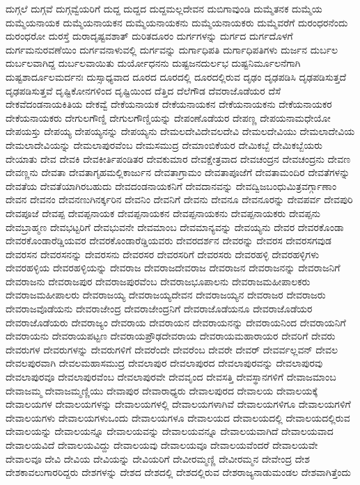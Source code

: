 {ದುಗ್ಗಲೆ
ದುಗ್ಗವೆ
ದುಗ್ಗವ್ವೆಯರಿಗೆ
ದುದ್ದ
ದುದ್ದದ
ದುದ್ದಮಲ್ಲದೇವನ
ದುಬಿಗಾವುಂಡಿ
ದುಮ್ಮೆತನಕ
ದುಮ್ಮೆಯ
ದುಮ್ಮೆಯನಾಯಕ
ದುಮ್ಮೆಯನಾಯಕನ
ದುಮ್ಮೆಯನಾಯಕನು
ದುಮ್ಮೆಯನಾಯಕರು
ದುಮ್ಮೆವರೆಗೆ
ದುರಂಧರನೆಂದು
ದುರಂಧರೋ
ದುರಸ್ತೆ
ದುರಾದೃಷ್ಟವಶಾತ್
ದುರಿತದೂರಂ
ದುರ್ಗಗಳನ್ನು
ದುರ್ಗದ
ದುರ್ಗದೊಳಗೆ
ದುರ್ಗಮನುರವಣೆಯಿಂ
ದುರ್ಗವನಾಳುವಲ್ಲಿ
ದುರ್ಗವನ್ನು
ದುರ್ಗಾಧಿಪತಿ
ದುರ್ಗಾಧಿಪತಿಗಳು
ದುರ್ಜನ
ದುರ್ಬಲ
ದುರ್ಬಲವಾಗಿದ್ದ
ದುರ್ಬಲವಾಯಿತು
ದುರ್ಯೋಧನನು
ದುಷ್ಟಜನದುರ್ಲಭ
ದುಷ್ಟನಿರ್ಮೂಲನೆಗಾಗಿ
ದುಷ್ಟಶಾರ್ದೂಲಮರ್ದನಃ
ದುಸ್ಸಾಧ್ಯವಾದ
ದೂರದ
ದೂರದಲ್ಲಿ
ದೂರದಲ್ಲಿರುವ
ದೃಢಂ
ದೃಢಪಡಿಸಿ
ದೃಢಪಡಿಸುತ್ತದೆ
ದೃಢಪಡಿಸುತ್ತವೆ
ದೃಷ್ಟಿಕೋನಗಳಿಂದ
ದೃಷ್ಟಿಯಿಂದ
ದೆತ್ತಿದ
ದೆಲೆಗೌಡ
ದೆವರಾಜೊಡೆಯರ
ದೆಸೆ
ದೇಕವೆದಂಡನಾಯಕಿತಿಯ
ದೇಕವ್ವೆ
ದೇಕೆಯನಾಯಕ
ದೇಕೆಯನಾಯಕನ
ದೇಕೆಯನಾಯಕನು
ದೇಕೆಯನಾಯಕರ
ದೇಕೆಯನಾಯಕರು
ದೇಗುಲಗೌಣ್ಡಿ
ದೇಗುಲಗೌಣ್ಡಿಯನ್ನು
ದೇಪಂಣೊಡೆಯರ
ದೇಪಣ್ಣ
ದೇಪಯನಾಮಧೇಯೋ
ದೇಪಯಸ್ತು
ದೇಪಯ್ಯ
ದೇಪಯ್ಯನನ್ನು
ದೇಪಯ್ಯನು
ದೇಮಲದೇವಿದೇವಲದೇವಿ
ದೇಮಲದೇವಿಯು
ದೇಮಲಾದೇವಿಯ
ದೇಮಲಾದೇವಿಯನ್ನು
ದೇಮಲಾಪುರವೆಂಬ
ದೇಮಸಮುದ್ರ
ದೇಮಾಂಬಿಕೆಯರ
ದೇಮಿಕಬ್ಬೆ
ದೇಮಿಕಬ್ಬೆಯರು
ದೇಯಾತು
ದೇವ
ದೇವಕಿ
ದೇವಕೀರ್ತಿಪಂಡಿತರ
ದೇವಕುಮಾರ
ದೇವಕ್ಷೇತ್ರವಾದ
ದೇವಚಂದ್ರನ
ದೇವಚಂದ್ರನು
ದೇವಣ
ದೇವಣ್ಣನು
ದೇವತಾ
ದೇವತಾಗೃಹಮಲ್ಲಿಕಾರ್ಜುನ
ದೇವತಾಗ್ರಾಮಂ
ದೇವತಾಪೂಜೆಗೆ
ದೇವತಾಮಂದಿರ
ದೇವತೆಗಳನ್ನು
ದೇವತೆಯ
ದೇವತೆಯಾಗಿರಬಹುದು
ದೇವದಂಡನಾಯಕನಿಗೆ
ದೇವದಾನವನ್ನು
ದೇವದ್ವಿಜಬಂಧುಮಿತ್ರವರ್ಗ್ಗಾಣಾಂ
ದೇವನ
ದೇವನಂ
ದೇವನಣುಗಿನರ್ಕ್ಕರಿನ
ದೇವನಿಂ
ದೇವನಿಗೆ
ದೇವನು
ದೇವನೂ
ದೇವನೂರನ್ನು
ದೇವಪರ್ವ
ದೇವಪುರಿ
ದೇವಪೂಜೆ
ದೇವಪ್ಪ
ದೇವಪ್ಪನಾಯಕ
ದೇವಪ್ಪನಾಯಕನ
ದೇವಪ್ಪನಾಯಕನು
ದೇವಪ್ಪನಾಯಕರು
ದೇವಪ್ಪನು
ದೇವಬ್ರಾಹ್ಮಣ
ದೇವಭಟ್ಟರಿಗೆ
ದೇವಭುವನೇ
ದೇವಮಾಂಬ
ದೇವಮಾನ್ಯವನ್ನು
ದೇವಯ್ಯನು
ದೇವರ
ದೇವರಕೊಂಡಾ
ದೇವರಕೊಂಡಾರೆಡ್ಡಿಯವರ
ದೇವರಕೊಂಡಾರೆಡ್ಡಿಯವರು
ದೇವರದರ್ಶನ
ದೇವರನ್ನು
ದೇವರಸ
ದೇವರಸಗವುಡ
ದೇವರಸನ
ದೇವರಸನನ್ನು
ದೇವರಸನು
ದೇವರಸರ
ದೇವರಸರಿಗೆ
ದೇವರಸರು
ದೇವರಹಳ್ಳಿ
ದೇವರಹಳ್ಳಿಗಳು
ದೇವರಹಳ್ಳಿಯ
ದೇವರಹಳ್ಳಿಯನ್ನು
ದೇವರಾಜ
ದೇವರಾಜದೇವರಾಜ
ದೇವರಾಜನ
ದೇವರಾಜನನ್ನು
ದೇವರಾಜನಿಗೆ
ದೇವರಾಜನು
ದೇವರಾಜಪುರ
ದೇವರಾಜಪುರವೆಂಬ
ದೇವರಾಜಭೂಪಾಲನು
ದೇವರಾಜಮಹೀಪಾಲಕರು
ದೇವರಾಜಮಹೀಪಾಲರು
ದೇವರಾಜಯ್ಯ
ದೇವರಾಜಯ್ಯದೇವನ
ದೇವರಾಜಯ್ಯನ
ದೇವರಾಜರ
ದೇವರಾಜರು
ದೇವರಾಜವೊಡೆಯನು
ದೇವರಾಜೇಂದ್ರ
ದೇವರಾಜೇಂದ್ರನಿಗೆ
ದೇವರಾಜೊಡೆಯನೂ
ದೇವರಾಜೊಡೆಯರ
ದೇವರಾಜೊಡೆಯರು
ದೇವರಾಜ್ಯಂ
ದೇವರಾಯ
ದೇವರಾಯನ
ದೇವರಾಯನನ್ನು
ದೇವರಾಯನಿಂದ
ದೇವರಾಯನಿಗೆ
ದೇವರಾಯನು
ದೇವರಾಯಪಟ್ಟಣ
ದೇವರಾಯಪ್ರೌಢದೇವರಾಯ
ದೇವರಾಯಮಹಾರಾಯರ
ದೇವರಿಗೆ
ದೇವರು
ದೇವರುಗಳ
ದೇವರುಗಳನ್ನು
ದೇವರುಗಳಿಗೆ
ದೇವರೆಂದೇ
ದೇವರೆಂಬ
ದೇವರೇ
ದೇವರ್
ದೇವರ್ವಲ್ಲವನ್
ದೇವಲ
ದೇವಲಪುರವಾಗಿ
ದೇವಲಮಹಾಸಮುದ್ರ
ದೇವಲಾಪುರ
ದೇವಲಾಪುರದ
ದೇವಲಾಪುರವನ್ನು
ದೇವಲಾಪುರವು
ದೇವಲಾಪುರವೂ
ದೇವಲಾಪುರವೆಂಬ
ದೇವಲಾಪುರವೇ
ದೇವವೃಂದ
ದೇವಸತ್ತಿ
ದೇವಸ್ಥಾನಗಳಿಗೆ
ದೇವಾಜಮಾಂಬ
ದೇವಾಜಮ್ಮ
ದೇವಾಜಮ್ಮಣ್ಣಿಯು
ದೇವಾಪುರ
ದೇವಾರಾಧ್ಯರು
ದೇವಾಲಪುರದ
ದೇವಾಲಯ
ದೇವಾಲಯಕ್ಕೆ
ದೇವಾಲಯಗಳ
ದೇವಾಲಯಗಳನ್ನು
ದೇವಾಲಯಗಳಲ್ಲಿ
ದೇವಾಲಯಗಳಾಗಿವೆ
ದೇವಾಲಯಗಳಿಗೂ
ದೇವಾಲಯಗಳಿಗೆ
ದೇವಾಲಯಗಳು
ದೇವಾಲಯಗಳುಒಂದು
ದೇವಾಲಯಗಳೂ
ದೇವಾಲಯದ
ದೇವಾಲಯದಲ್ಲಿ
ದೇವಾಲಯದಲ್ಲಿರುವ
ದೇವಾಲಯನ್ನು
ದೇವಾಲಯನ್ನೂ
ದೇವಾಲಯವನ್ನು
ದೇವಾಲಯವನ್ನೂ
ದೇವಾಲಯವಾಗಿದೆ
ದೇವಾಲಯವಾದ
ದೇವಾಲಯವಿದೆ
ದೇವಾಲಯವಿದ್ದು
ದೇವಾಲಯವು
ದೇವಾಲಯವೂ
ದೇವಾಲಯವೆಂದರೆ
ದೇವಾಲಯವೇ
ದೇವಾಲವೂ
ದೇವಿ
ದೇವಿಯ
ದೇವಿಯನ್ನು
ದೇವಿಯರಿಗೆ
ದೇವೀರಮ್ಮಣ್ಣಿ
ದೇವೀರಮ್ಮನ
ದೇವೇಂದ್ರ
ದೇಶ
ದೇಶಕಾವಲುಗಾರರಿದ್ದರು
ದೇಶಗಳನ್ನು
ದೇಶದ
ದೇಶದಲ್ಲಿ
ದೇಶದಲ್ಲಿರುವ
ದೇಶರಾಜ್ಯನಾಡುಮಂಡಲ
ದೇಶವಾಗಿತ್ತೆಂದು
}
